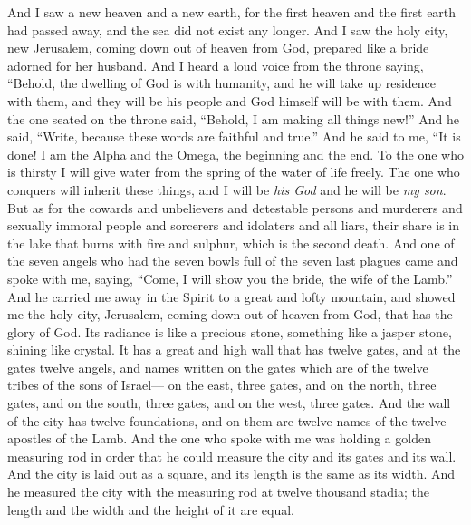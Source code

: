 \begin{biblechapter} %
 And I saw a new heaven and a new earth, for the first heaven and the first earth had passed away, and the sea did not exist any longer.
\verse And I saw the holy city, new Jerusalem, coming down out of heaven from God, prepared like a bride adorned for her husband.
\verse And I heard a loud voice from the throne saying,
\verse “Behold, the dwelling of God is with humanity, 
and he will take up residence with them, 
and they will be his people 
and God himself will be with them.
\verse And the one seated on the throne said, “Behold, I am making all things new!” And he said, “Write, because these words are faithful and true.”
\verse And he said to me, “It is done! I am the Alpha and the Omega, the beginning and the end. To the one who is thirsty I will give water from the spring of the water of life freely.
\verse The one who conquers will inherit these things, and I will be \textit{his God} and he will be \textit{my son}.
\verse But as for the cowards and unbelievers and detestable persons and murderers and sexually immoral people and sorcerers and idolaters and all liars, their share is in the lake that burns with fire and sulphur, which is the second death.
 And one of the seven angels who had the seven bowls full of the seven last plagues came and spoke with me, saying, “Come, I will show you the bride, the wife of the Lamb.”
\verse And he carried me away in the Spirit to a great and lofty mountain, and showed me the holy city, Jerusalem, coming down out of heaven from God,
\verse that has the glory of God. Its radiance is like a precious stone, something like a jasper stone, shining like crystal.
\verse It has a great and high wall that has twelve gates, and at the gates twelve angels, and names written on the gates which are of the twelve tribes of the sons of Israel—
\verse on the east, three gates, and on the north, three gates, and on the south, three gates, and on the west, three gates.
\verse And the wall of the city has twelve foundations, and on them are twelve names of the twelve apostles of the Lamb.
\verse And the one who spoke with me was holding a golden measuring rod in order that he could measure the city and its gates and its wall.
\verse And the city is laid out as a square, and its length is the same as its width. And he measured the city with the measuring rod at twelve thousand stadia; the length and the width and the height of it are equal.

\end{biblechapter}

